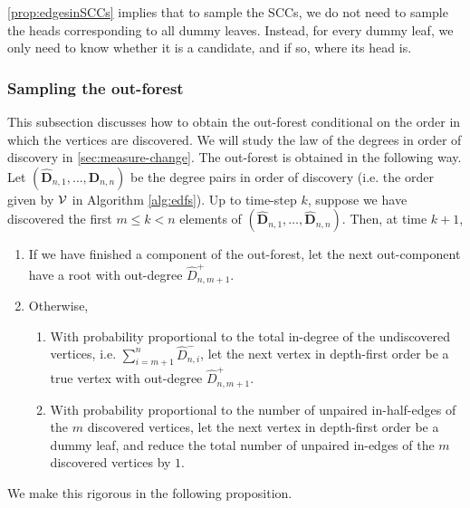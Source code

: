 \cref{prop:edgesinSCCs} implies that to sample the SCCs, we do not need to sample the heads corresponding to all dummy leaves. Instead, for every dummy leaf, we only need to know whether it is a candidate, and if so, where its head is. 
\subsubsection{Sampling the out-forest}\label{subsubsec.samplingoutforest}
This subsection discusses how to obtain the out-forest conditional on the order in which the vertices are discovered. We will study the law of the degrees in order of discovery in \cref{sec:measure-change}. The out-forest is obtained in the following way. Let $(\mathbf{\widehat{D}}_{n,1},\dots,\mathbf{\widehat{D}}_{n,n})$ be the degree pairs in order of discovery (i.e. the order given by $\mathcal V$ in Algorithm \ref{alg:edfs}). Up to time-step $k$, suppose we have discovered the first $m\leq k<n$ elements of  $(\mathbf{\widehat{D}}_{n,1},\dots,\mathbf{\widehat{D}}_{n,n})$. Then, at time $k+1$,
\begin{enumerate}
    \item If we have finished a component of the out-forest, let the next out-component have a root with out-degree $\widehat{D}_{n,m+1}^+$. 
    \item Otherwise,
    \begin{enumerate}\item With probability proportional to the total in-degree of the undiscovered vertices, i.e. $\sum_{i={m+1}}^{n} \widehat{D}_{n,i}^-$, let the next vertex in depth-first order be a true vertex with out-degree $\widehat{D}_{n,m+1}^+$. 
    \item With probability proportional to the number of unpaired in-half-edges of the $m$ discovered vertices, let the next vertex in depth-first order be a dummy leaf, and reduce the total number of unpaired in-edges of the $m$ discovered vertices by $1$.
\end{enumerate}
\end{enumerate}
We make this rigorous in the following proposition.
